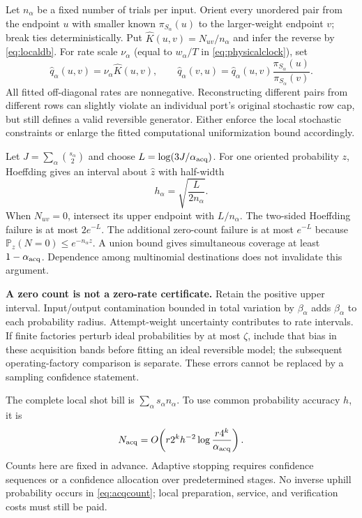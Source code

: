\documentclass[10pt,a4paper]{article}
\theoremstyle{definition}\newtheorem{assumption}[theorem]{Assumption}
\newcommand{\Prob}{\mathbb P}
\begin{document}
Let $n_\alpha$ be a fixed number of trials per input. Orient every unordered pair from the endpoint $u$ with smaller known $\pi_{S_\alpha}(u)$ to the larger-weight endpoint $v$; break ties deterministically. Put $\widehat K(u,v)=N_{uv}/n_\alpha$ and infer the reverse by \eqref{eq:localdb}. For rate scale $\nu_\alpha$ (equal to $w_\alpha/T$ in \eqref{eq:physicalclock}), set
\begin{equation}
 \widehat q_\alpha(u,v)=\nu_\alpha\widehat K(u,v),\qquad
 \widehat q_\alpha(v,u)=\widehat q_\alpha(u,v)
      \frac{\pi_{S_\alpha}(u)}{\pi_{S_\alpha}(v)}.
 \label{eq:fit}
\end{equation}
All fitted off-diagonal rates are nonnegative. Reconstructing different pairs from different rows can slightly violate an individual port's original stochastic row cap, but still defines a valid reversible generator. Either enforce the local stochastic constraints or enlarge the fitted computational uniformization bound accordingly.

Let $J=\sum_\alpha\binom{s_\alpha}{2}$ and choose $L=\log(3J/\alpha_{\rm acq})$. For one oriented probability $z$, Hoeffding gives an interval about $\widehat z$ with half-width
\begin{equation}
 h_\alpha=\sqrt{\frac{L}{2n_\alpha}}.
 \label{eq:hoeffding}
\end{equation}
When $N_{uv}=0$, intersect its upper endpoint with $L/n_\alpha$. The two-sided Hoeffding failure is at most $2e^{-L}$. The additional zero-count failure is at most $e^{-L}$ because $\Prob_z(N=0)\le e^{-n_\alpha z}$. A union bound gives simultaneous coverage at least $1-\alpha_{\rm acq}$. Dependence among multinomial destinations does not invalidate this argument.

\textbf{A zero count is not a zero-rate certificate.} Retain the positive upper interval. Input/output contamination bounded in total variation by $\beta_\alpha$ adds $\beta_\alpha$ to each probability radius. Attempt-weight uncertainty contributes to rate intervals. If finite factories perturb ideal probabilities by at most $\zeta$, include that bias in these acquisition bands before fitting an ideal reversible model; the subsequent operating-factory comparison is separate. These errors cannot be replaced by a sampling confidence statement.

The complete local shot bill is $\sum_\alpha s_\alpha n_\alpha$. To use common probability accuracy $h$, it is
\begin{equation}
 N_{\rm acq}=O\!\left(r2^k h^{-2}\log\frac{r4^k}{\alpha_{\rm acq}}\right).
 \label{eq:acqcount}
\end{equation}
Counts here are fixed in advance. Adaptive stopping requires confidence sequences or a confidence allocation over predetermined stages. No inverse uphill probability occurs in \eqref{eq:acqcount}; local preparation, service, and verification costs must still be paid.
\end{document}
